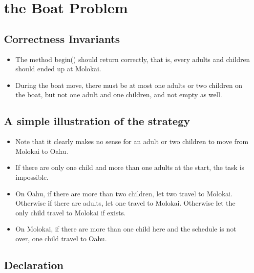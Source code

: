 \documentclass{article}
\begin{document}
	\section{the Boat Problem}
	
	\subsection{Correctness Invariants}
	
	\begin{itemize}
		\item The method begin() should return correctly, that is, every adults and children should ended up at Molokai.
		
		\item During the boat move, there must be at most one adults or two children on the boat, but not one adult and one children, and not empty as well. 
	\end{itemize}
	
	\subsection{A simple illustration of the strategy}
	
	\begin{itemize}
		\item Note that it clearly makes no sense for an adult or two children to move from Molokai to Oahu.
		
		\item If there are only one child and more than one adults at the start, the task is impossible.
		
		\item On Oahu, if there are more than two children, let two travel to Molokai. Otherwise if there are adults, let one travel to Molokai. Otherwise let the only child travel to Molokai if exists.
		
		\item On Molokai, if there are more than one child here and the schedule is not over, one child travel to Oahu.
	\end{itemize}
	
	\subsection{Declaration}
	
\end{document}
